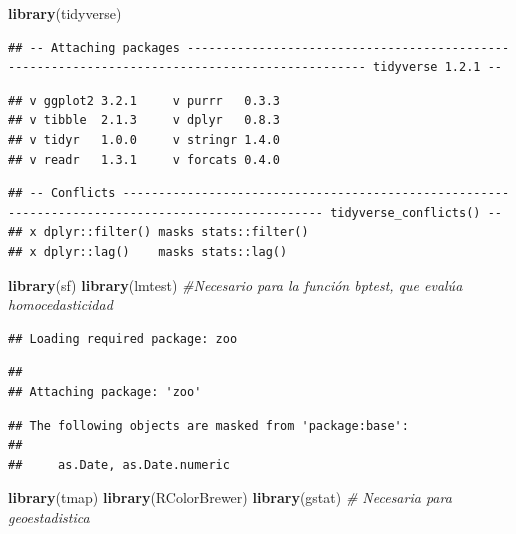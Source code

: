 \documentclass[11pt,]{article}
\newenvironment{Shaded}{\begin{snugshade}}{\end{snugshade}}
\newcommand{\KeywordTok}[1]{\textcolor[rgb]{0.13,0.29,0.53}{\textbf{#1}}}
\newcommand{\CommentTok}[1]{\textcolor[rgb]{0.56,0.35,0.01}{\textit{#1}}}
\newcommand{\NormalTok}[1]{#1}
\begin{document}
\begin{Shaded}
\begin{Highlighting}[]
\KeywordTok{library}\NormalTok{(tidyverse)}
\end{Highlighting}
\end{Shaded}

\begin{verbatim}
## -- Attaching packages ----------------------------------------------------------------------------------------------- tidyverse 1.2.1 --
\end{verbatim}

\begin{verbatim}
## v ggplot2 3.2.1     v purrr   0.3.3
## v tibble  2.1.3     v dplyr   0.8.3
## v tidyr   1.0.0     v stringr 1.4.0
## v readr   1.3.1     v forcats 0.4.0
\end{verbatim}

\begin{verbatim}
## -- Conflicts -------------------------------------------------------------------------------------------------- tidyverse_conflicts() --
## x dplyr::filter() masks stats::filter()
## x dplyr::lag()    masks stats::lag()
\end{verbatim}

\begin{Shaded}
\begin{Highlighting}[]
\KeywordTok{library}\NormalTok{(sf)}
\KeywordTok{library}\NormalTok{(lmtest) }\CommentTok{#Necesario para la función bptest, que evalúa homocedasticidad}
\end{Highlighting}
\end{Shaded}

\begin{verbatim}
## Loading required package: zoo
\end{verbatim}

\begin{verbatim}
## 
## Attaching package: 'zoo'
\end{verbatim}

\begin{verbatim}
## The following objects are masked from 'package:base':
## 
##     as.Date, as.Date.numeric
\end{verbatim}

\begin{Shaded}
\begin{Highlighting}[]
\KeywordTok{library}\NormalTok{(tmap)}
\KeywordTok{library}\NormalTok{(RColorBrewer)}
\KeywordTok{library}\NormalTok{(gstat) }\CommentTok{# Necesaria para geoestadistica}
\end{Highlighting}
\end{Shaded}
\end{document}
